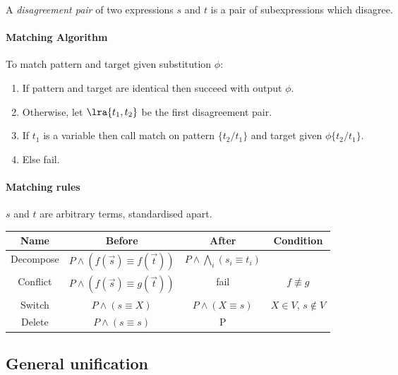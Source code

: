 \documentclass{article}
\begin{document}
\begin{definition}
	A \emph{disagreement pair} of two expressions $s$ and $t$ is a pair of subexpressions
	which disagree.
\end{definition}

\paragraph{Matching Algorithm}

To match pattern and target given substitution $\phi$:

\begin{enumerate}
	\item If pattern and target are identical then succeed with output $\phi$.
	\item Otherwise, let $\lra{t_1, t_2}$ be the first disagreement pair.
	\item If $t_1$ is a variable then call match on pattern $\{t_2/t_1\}$ and target given $\phi\{t_2/t_1\}$.
	\item Else fail.
\end{enumerate}

\paragraph*{Matching rules}
$s$ and $t$ are arbitrary terms, standardised apart.
\begin{center}
	\begin{tabular}{c | c | c | c}
		\textbf{Name} & \textbf{Before}                        & \textbf{After}                        & \textbf{Condition}     \\\hline
		Decompose     & $P\wedge (f(\vec s) \equiv f(\vec t))$ & $P\wedge\bigwedge_i (s_i \equiv t_i)$ &                        \\\hline
		Conflict      & $P\wedge (f(\vec s) \equiv g(\vec t))$ & fail                                  & $f\not\equiv g$        \\\hline
		Switch        & $P\wedge (s\equiv X)$                  & $P\wedge(X\equiv s)$                  & $X\in V$, $s\not\in V$ \\\hline
		Delete        & $P\wedge (s\equiv s)$                  & P                                     &
	\end{tabular}
\end{center}

\subsection{General unification}
\end{document}
